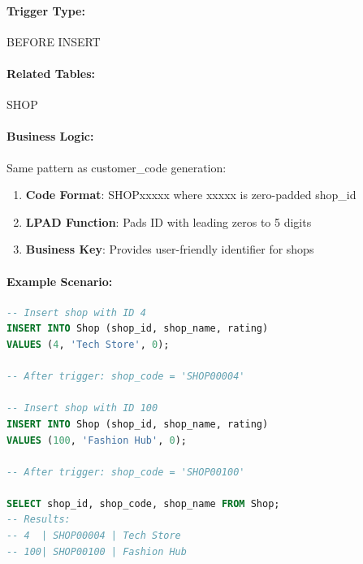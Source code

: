 \paragraph{Trigger Type:} BEFORE INSERT

\paragraph{Related Tables:} SHOP

\paragraph{Business Logic:}
Same pattern as customer\_code generation:
\begin{enumerate}
    \item \textbf{Code Format}: SHOPxxxxx where xxxxx is zero-padded shop\_id
    \item \textbf{LPAD Function}: Pads ID with leading zeros to 5 digits
    \item \textbf{Business Key}: Provides user-friendly identifier for shops
\end{enumerate}

\paragraph{Example Scenario:}

\begin{lstlisting}[language=SQL]
-- Insert shop with ID 4
INSERT INTO Shop (shop_id, shop_name, rating)
VALUES (4, 'Tech Store', 0);

-- After trigger: shop_code = 'SHOP00004'

-- Insert shop with ID 100
INSERT INTO Shop (shop_id, shop_name, rating)
VALUES (100, 'Fashion Hub', 0);

-- After trigger: shop_code = 'SHOP00100'

SELECT shop_id, shop_code, shop_name FROM Shop;
-- Results:
-- 4  | SHOP00004 | Tech Store
-- 100| SHOP00100 | Fashion Hub
\end{lstlisting}

